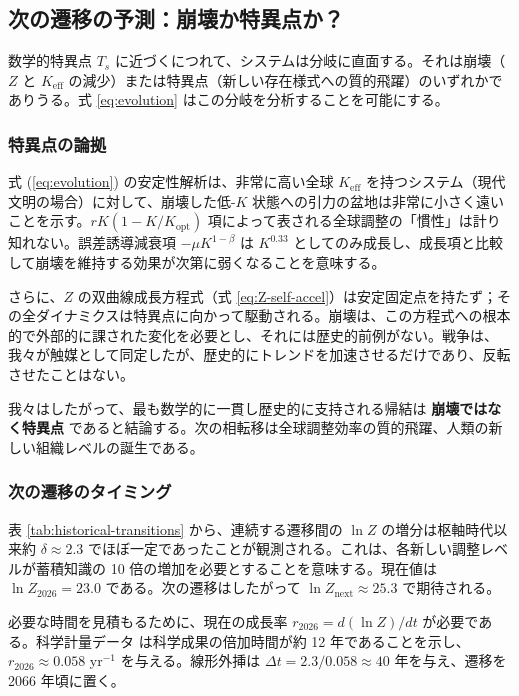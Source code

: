 \documentclass[12pt,a4paper]{article}
\theoremstyle{remark}
\begin{document}
	\subsection{次の遷移の予測：崩壊か特異点か？}
	
	数学的特異点 \(T_s\) に近づくにつれて、システムは分岐に直面する。それは崩壊（\(Z\) と \(K_{\text{eff}}\) の減少）または特異点（新しい存在様式への質的飛躍）のいずれかでありうる。式 \ref{eq:evolution} はこの分岐を分析することを可能にする。
	
	\subsubsection{特異点の論拠}
	
	式 (\ref{eq:evolution}) の安定性解析は、非常に高い全球 \(K_{\text{eff}}\) を持つシステム（現代文明の場合）に対して、崩壊した低-\(K\) 状態への引力の盆地は非常に小さく遠いことを示す。\(rK(1-K/K_{\text{opt}})\) 項によって表される全球調整の「慣性」は計り知れない。誤差誘導減衰項 \(-\mu K^{1-\beta}\) は \(K^{0.33}\) としてのみ成長し、成長項と比較して崩壊を維持する効果が次第に弱くなることを意味する。
	
	さらに、\(Z\) の双曲線成長方程式（式 \ref{eq:Z-self-accel}）は安定固定点を持たず；その全ダイナミクスは特異点に向かって駆動される。崩壊は、この方程式への根本的で外部的に課された変化を必要とし、それには歴史的前例がない。戦争は、我々が触媒として同定したが、歴史的にトレンドを加速させるだけであり、反転させたことはない。
	
	我々はしたがって、最も数学的に一貫し歴史的に支持される帰結は \textbf{崩壊ではなく特異点} であると結論する。次の相転移は全球調整効率の質的飛躍、人類の新しい組織レベルの誕生である。
	
	\subsubsection{次の遷移のタイミング}
	
	表 \ref{tab:historical-transitions} から、連続する遷移間の \(\ln Z\) の増分は枢軸時代以来約 \(\delta \approx 2.3\) でほぼ一定であったことが観測される。これは、各新しい調整レベルが蓄積知識の 10 倍の増加を必要とすることを意味する。現在値は \(\ln Z_{2026} = 23.0\) である。次の遷移はしたがって \(\ln Z_{\text{next}} \approx 25.3\) で期待される。
	
	必要な時間を見積もるために、現在の成長率 \(r_{2026} = d(\ln Z)/dt\) が必要である。科学計量データ \cite{Bornmann2015} は科学成果の倍加時間が約 12 年であることを示し、\(r_{2026} \approx 0.058\) yr\(^{-1}\) を与える。線形外挿は \(\Delta t = 2.3 / 0.058 \approx 40\) 年を与え、遷移を 2066 年頃に置く。
	
\end{document}
